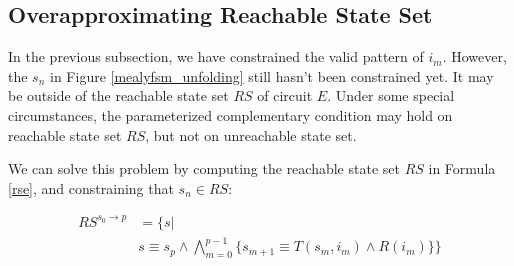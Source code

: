 \documentclass[journal]{IEEEtran}
\begin{document}
\subsection{Overapproximating Reachable State Set}\label{subsec_Prfx}
In the previous subsection, we have constrained the valid pattern of $i_m$.
However,
the $s_n$ in Figure \ref{mealyfsm_unfolding} still hasn't been constrained yet.
It may be outside of the reachable state set $RS$ of circuit $E$.
Under some special circumstances,
the parameterized complementary condition may hold on reachable state set $RS$,
but not on unreachable state set.

We can solve this problem by computing the reachable state set $RS$ in Formula \ref{rse},
and constraining that $s_n\in RS$:

\begin{equation}\label{rse_p_forward}
\begin{split}
RS^{s_0\to p} & =  \Big\{s| \\
& s\equiv s_p\wedge \bigwedge_{m=0}^{p-1}\big\{
s_{m+1}\equiv T(s_m,i_m)\wedge R(i_m)
\big\}\Big\}
\end{split}
\end{equation}

\vspace{0.2cm}
\end{document}
